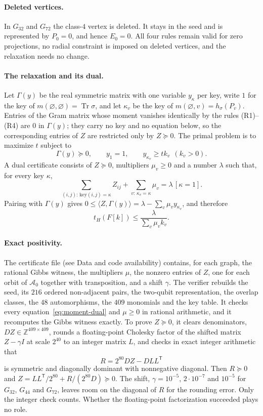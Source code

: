 \documentclass[11pt]{article}
\theoremstyle{definition}
\DeclareMathOperator{\Tr}{Tr}
\begin{document}
\paragraph{Deleted vertices.}
In $G_{32}$ and $G_{72}$ the class-$4$ vertex is deleted.  It stays in the
seed and is represented by $P_0=0$, and hence $E_0=0$.  All four rules remain
valid for zero projections, no radial constraint is imposed on deleted
vertices, and the relaxation needs no change.

\paragraph{The relaxation and its dual.}
Let $\Gamma(y)$ be the real symmetric matrix with one variable $y_\kappa$ per
key, write $1$ for the key of $m(\varnothing,\varnothing)=\Tr\sigma$, and let
$\kappa_v$ be the key of $m(\varnothing,v)=h_\sigma(P_v)$.
Entries of the Gram matrix whose moment vanishes identically by the rules
(R1)--(R4) are $0$ in $\Gamma(y)$; they carry no key and no equation below,
so the corresponding entries of $Z$ are restricted only by $Z\succeq0$.  The
primal problem is to maximize $t$ subject to
\[
 \Gamma(y)\succeq0,\qquad y_1=1,\qquad y_{\kappa_v}\ge tk_v\ \ (k_v>0).
\]
A dual certificate consists of $Z\succeq0$, multipliers $\mu_v\ge0$ and a
number $\lambda$ such that, for every key $\kappa$,
\begin{equation}\label{eq:moment-dual}
 \sum_{(i,j):\,\mathrm{key}(i,j)=\kappa}Z_{ij}
 +\sum_{v:\,\kappa_v=\kappa}\mu_v=\lambda\,[\kappa=1].
\end{equation}
Pairing with $\Gamma(y)$ gives
$0\le\langle Z,\Gamma(y)\rangle=\lambda-\sum_v\mu_vy_{\kappa_v}$, and
therefore
\[
 t_H(F[k])\le\frac{\lambda}{\sum_v\mu_vk_v}.
\]

\paragraph{Exact positivity.}
The certificate file (see Data and code availability) contains, for each
graph, the rational Gibbs witness, the multipliers $\mu$, the nonzero entries
of $Z$, one for each orbit of $\mathcal A_0$ together with transposition, and
a shift $\gamma$.  The verifier rebuilds the seed, its $216$ ordered non-adjacent
pairs, the two-qubit representation, the overlap classes, the $48$
automorphisms, the $409$ monomials and the key table.  It checks
every equation~\eqref{eq:moment-dual} and $\mu\ge0$ in rational arithmetic,
and it recomputes the Gibbs witness exactly.  To prove $Z\succeq0$, it clears
denominators, $DZ\in\mathbb Z^{409\times409}$, rounds a floating-point
Cholesky factor of the shifted matrix $Z-\gamma I$ at scale $2^{40}$ to an
integer matrix $L$, and checks in exact integer arithmetic that
\[
 R=2^{80}DZ-DLL^{\mathsf T}
\]
is symmetric and diagonally dominant with nonnegative diagonal.  Then
$R\succeq0$ and $Z=LL^{\mathsf T}/2^{80}+R/(2^{80}D)\succeq0$.  The shift,
$\gamma=10^{-5}$, $2\cdot10^{-7}$ and $10^{-5}$ for $G_{32}$, $G_{44}$ and
$G_{72}$, leaves room on the diagonal of $R$ for the rounding error.  Only
the integer check counts.  Whether the floating-point factorization
succeeded plays no role.
\end{document}
